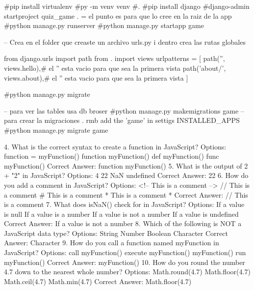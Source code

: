 #pip install virtualenv
#py -m venv venv
#.\venv\Scripts\Activate
#pip install django
#django-admin startproject quiz_game . = el punto es para que lo cree en la raiz de la app
#python manage.py runserver
#python manage.py startapp game

-- Crea en el folder que creaste un archivo urls.py i dentro crea las rutas globales 

from django.urls import path
from . import views
urlpatterns = [
    path('', views.hello),# el  '' esta vacio para que sea la primera vista 
    path('about/', views.about),# el  '' esta vacio para que sea la primera vista 
]

#python manage.py migrate

-- para ver las tables usa db broser 
#python manage.py makemigrations game  -- para crear la migraciones . rmb add the 'game' in settigs INSTALLED_APPS
#python manage.py migrate game  









4. What is the correct syntax to create a function in JavaScript?
Options:
function = myFunction()
function myFunction() {}
def myFunction()
func myFunction()
Correct Answer: function myFunction() {}
5. What is the output of 2 + "2" in JavaScript?
Options:
4
22
NaN
undefined
Correct Answer: 22
6. How do you add a comment in JavaScript?
Options:
<!-- This is a comment -->
// This is a comment
# This is a comment
* This is a comment *
Correct Answer: // This is a comment
7. What does isNaN() check for in JavaScript?
Options:
If a value is null
If a value is a number
If a value is not a number
If a value is undefined
Correct Answer: If a value is not a number
8. Which of the following is NOT a JavaScript data type?
Options:
String
Number
Boolean
Character
Correct Answer: Character
9. How do you call a function named myFunction in JavaScript?
Options:
call myFunction()
execute myFunction()
myFunction()
run myFunction()
Correct Answer: myFunction()
10. How do you round the number 4.7 down to the nearest whole number?
Options:
Math.round(4.7)
Math.floor(4.7)
Math.ceil(4.7)
Math.min(4.7)
Correct Answer: Math.floor(4.7)
